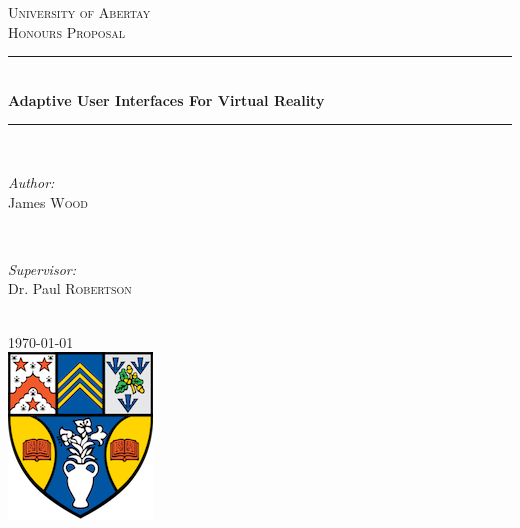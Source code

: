 \documentclass[9pt,twocolumn]{article}
\begin{document}
\begin{titlepage}

\newcommand{\HRule}{\rule{\linewidth}{0.5mm}}

\center

\textsc{\LARGE University of Abertay}\\[1.5cm]
\textsc{\Large Honours Proposal}\\[0.5cm]

\HRule \\[0.4cm]
{ \huge \bfseries Adaptive User Interfaces For Virtual Reality}\\[0.4cm]
\HRule \\[1.5cm]

\begin{minipage}{0.4\textwidth}
\begin{flushleft} \large
\emph{Author:}\\
James \textsc{Wood}
\end{flushleft}
\end{minipage}
~
\begin{minipage}{0.4\textwidth}
\begin{flushright} \large
\emph{Supervisor:} \\
Dr. Paul \textsc{Robertson}
\end{flushright}
\end{minipage}\\[2cm]

{\large \today}\\[2cm]

\includegraphics{logo.png}\\[1cm]

\vfill

\end{titlepage}

\pagebreak

\setcounter{page}{1}
\end{document}
